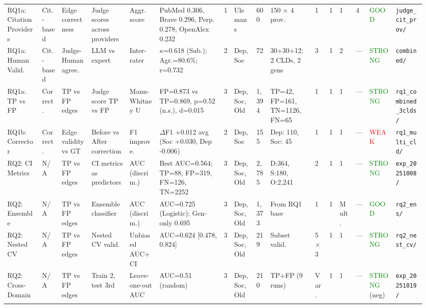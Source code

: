 \begin{landscape}
{\begin{longtable}{@{}p{1.8cm}p{1.2cm}p{1.5cm}p{1.8cm}p{1.2cm}p{2.8cm}p{0.5cm}p{1.5cm}p{1cm}p{2cm}p{0.6cm}p{0.6cm}p{0.8cm}p{1.5cm}p{1.2cm}p{2cm}@{}}
RQ1a: Citation Providers & Cit.-based & Edge correctness & Judge scores across providers & Aggr. score & PubMed 0.306, Brave 0.296, Perp. 0.278, OpenAlex 0.232 & 1 & Ulemans & 600 & 150 × 4 prov. & 1 & 1 & 1 & 4 & \textcolor{green}{GOOD} & \texttt{judge\_cit\_prov/} \\
\addlinespace

RQ1a: Human Valid. & Cit.-based & Judge-Human agree. & LLM vs expert & Inter-rater & $\kappa$=0.618 (Sub.); Agr.=80.6\%; r=0.732 & 2 & Dep,Soc & 72 & 30+30+12; 2 CLDs, 2 gens & 3 & 1 & 2 & --- & \textcolor{green}{STRONG} & \texttt{combined/} \\
\addlinespace

RQ1a: TP vs FP & Correct. & TP vs FP edges & Judge score TP vs FP & Mann-Whitney U & FP=0.873 vs TP=0.869, p=0.52 (n.s.), d=0.015 & 3 & Dep,Soc,Old & 1,394 & TP=42, FP=161, TN=1126, FN=65 & 1 & 1 & 1 & --- & \textcolor{green}{STRONG} & \texttt{rq1\_combined\_3clds/} \\
\addlinespace

RQ1b: Corrector & Correct. & Edge validity vs GT & Before vs After correction & F1 improve. & $\Delta$F1 +0.012 avg (Soc +0.030, Dep -0.006) & 2 & Dep, Soc & 155 & Dep: 110, Soc: 45 & 1 & 1 & 1 & --- & \textcolor{red}{WEAK} & \texttt{rq1\_multi\_cld/} \\
\addlinespace

RQ2: CI Metrics & N/A & TP vs FP edges & CI metrics as predictors & AUC (discrim.) & Best AUC=0.564; TP=88, FP=319, FN=126, TN=2252 & 3 & Dep,Soc,Old & 2,785 & D:364, S:180, O:2,241 & 2 & 1 & 1 & --- & \textcolor{green}{STRONG} & \texttt{exp\_20251008/} \\
\addlinespace

RQ2: Ensemble & N/A & TP vs FP edges & Ensemble classifier & AUC (discrim.) & AUC=0.725 (Logistic); Gen-only 0.695 & 3 & Dep,Soc,Old & 1,373 & From RQ1 base & 1 & 1 & Mult. & --- & \textcolor{green}{GOOD} & \texttt{rq2\_ens/} \\
\addlinespace

RQ2: Nested CV & N/A & TP vs FP edges & Nested CV valid. & Unbiased AUC+CI & AUC=0.624 [0.478, 0.824] & 3 & Dep,Soc,Old & 219 & Subset valid. & 5×3 & 1 & 1 & --- & \textcolor{green}{STRONG} & \texttt{rq2\_nest\_cv/} \\
\addlinespace

RQ2: Cross-Domain & N/A & TP vs FP edges & Train 2, test 3rd & Leave-one-out AUC & AUC=0.51 (random) & 3 & Dep,Soc,Old & 210 & TP+FP (9 runs) & Var. & 1 & 1 & --- & \textcolor{green}{STRONG} (neg) & \texttt{exp\_20251019/} \\
\addlinespace


\end{longtable}}
\end{landscape}
